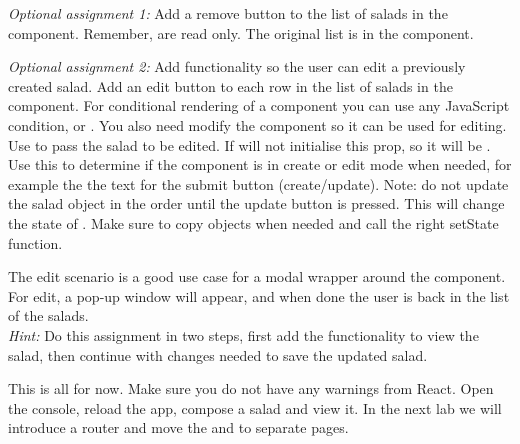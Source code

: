 \documentclass[fleqn, article, a4paper]{memoir}
\begin{document}
\begin{Assignments}
\item \emph{Optional assignment 1:} Add a remove button to the list of salads in the  component. Remember,  are read only. The original list is in the  component.

\item \emph{Optional assignment 2:}  Add functionality so the user can edit a previously created salad. Add an edit button to each row in the list of salads in the  component. For conditional rendering of a component you can use any JavaScript condition,  or . You also need modify the  component so it can be used for editing. Use  to pass the salad to be edited. If  will not initialise this prop, so it will be . Use this to determine if the  component is in create or edit mode when needed, for example the the text for the submit button (create/update). Note: do not update the salad object in the order until the update button is pressed. This will change the state of . Make sure to copy objects when needed and call the right setState function.

The edit scenario is a good use case for a modal wrapper around the  component. For edit, a pop-up window will appear, and when done the user is back in the list of the salads.
\\ \emph{Hint: } Do this assignment in two steps, first add the functionality to view the salad, then continue with changes needed to save the updated salad.

\item This is all for now. Make sure you do not have any warnings from React. Open the console, reload the app, compose a salad and view it. In the next lab we will introduce a router and move the  and  to separate pages.

\end{Assignments}


\end{document}
